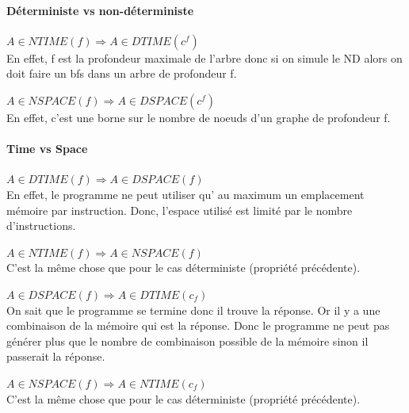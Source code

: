 \paragraph{Déterministe vs non-déterministe}
\begin{myprop}
	$A \in NTIME(f) \Rightarrow A \in DTIME(c^f)$ \\
	En effet, f est la profondeur maximale de l'arbre donc si on simule le
	ND alors on doit faire un bfs dans un arbre de profondeur f.
\end{myprop}

\begin{myprop}
	$A \in NSPACE(f) \Rightarrow A \in DSPACE(c^f)$ \\
	En effet, c'est une borne sur le nombre de noeuds d'un graphe de
	profondeur f.
\end{myprop}

\paragraph{Time vs Space}
\begin{myprop}
	$A \in DTIME(f) \Rightarrow A \in DSPACE(f)$ \\
	En effet, le programme ne peut utiliser qu’ au maximum un emplacement
	mémoire par instruction. Donc, l'espace utilisé est limité par le
	nombre d'instructions.
\end{myprop}

\begin{myprop}
	$A \in NTIME(f) \Rightarrow A \in NSPACE(f)$ \\
	C'est la même chose que pour le cas déterministe (propriété précédente).
\end{myprop}

\begin{myprop}
	$A \in DSPACE(f) \Rightarrow A \in DTIME(c_f)$ \\
	On sait que le programme se termine donc il trouve la réponse. Or il y
	a une combinaison de la mémoire qui est la réponse. Donc le programme
	ne peut pas générer plus que le nombre de combinaison possible de la
	mémoire sinon il passerait la réponse.
\end{myprop}

\begin{myprop}
	$A \in NSPACE(f) \Rightarrow A \in NTIME(c_f)$ \\
	C'est la même chose que pour le cas déterministe (propriété précédente).
\end{myprop}

